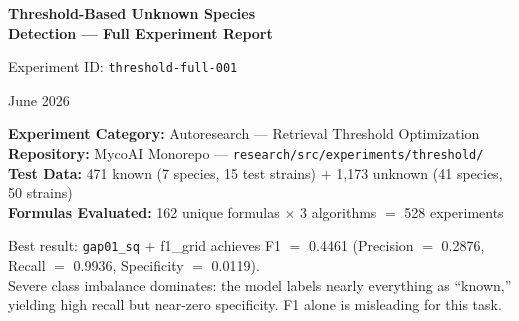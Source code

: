\documentclass[11pt,a4paper]{article}
\newcommand{\formula}[1]{\texttt{#1}}
\newcommand{\algo}[1]{\textsf{#1}}
\newcommand{\bestf}{0.4461}
\begin{document}

\begin{titlepage}
\centering
\vspace*{4cm}

{\Huge\bfseries Threshold-Based Unknown Species\\[8pt] Detection --- Full Experiment Report\par}

\vspace{1.5cm}

{\Large Experiment ID: \texttt{threshold-full-001}\par}

\vspace{1cm}

{\large June 2026\par}

\vspace{1.5cm}

{\normalsize
\textbf{Experiment Category:} Autoresearch --- Retrieval Threshold Optimization\\
\textbf{Repository:} MycoAI Monorepo --- \texttt{research/src/experiments/threshold/}\\
\textbf{Test Data:} 471 known (7 species, 15 test strains) $+$ 1{,}173 unknown (41 species, 50 strains)\\
\textbf{Formulas Evaluated:} 162 unique formulas $\times$ 3 algorithms $=$ 528 experiments
\par}

\vspace{2cm}

{\small
\begin{tcolorbox}[width=0.85\textwidth, colback=blue!5, colframe=blue!60, title={\textbf{Key Finding}}, fonttitle=\bfseries, center]
Best result: \formula{gap01\_sq} $+$ \algo{f1\_grid} achieves F1 $=$ \bestf{} (Precision $=$ 0.2876, Recall $=$ 0.9936, Specificity $=$ 0.0119).\\
Severe class imbalance dominates: the model labels nearly everything as ``known,'' yielding high recall but near-zero specificity. F1 alone is misleading for this task.
\end{tcolorbox}
}

\vfill
\end{titlepage}

\end{document}
